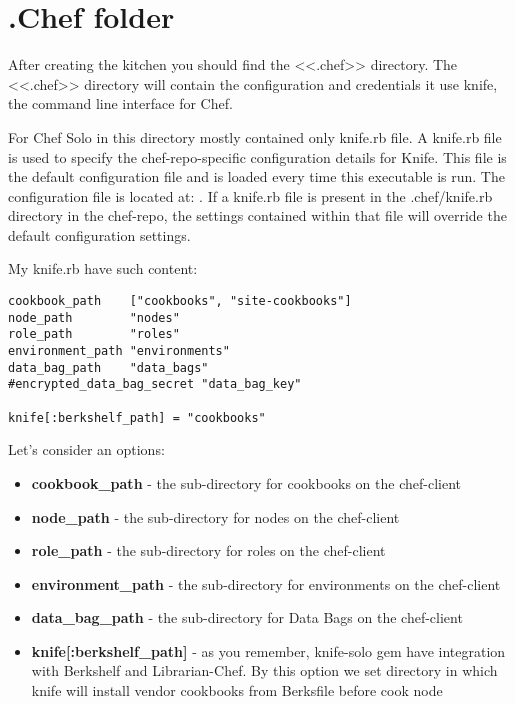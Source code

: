 \section{.Chef folder}\label{sec:solo-chef-folder}

After creating the kitchen you should find the <<.chef>> directory. The <<.chef>> directory will contain the configuration and credentials it use knife, the command line interface for Chef.

For Chef Solo in this directory mostly contained only knife.rb file. A knife.rb file is used to specify the chef-repo-specific configuration details for Knife. This file is the default configuration file and is loaded every time this executable is run. The configuration file is located at: . If a knife.rb file is present in the .chef/knife.rb directory in the chef-repo, the settings contained within that file will override the default configuration settings.

My knife.rb have such content:

\begin{lstlisting}[label=lst:my-cloud-chef-filder1,title=my-cloud/.chef/knife.rb]
cookbook_path    ["cookbooks", "site-cookbooks"]
node_path        "nodes"
role_path        "roles"
environment_path "environments"
data_bag_path    "data_bags"
#encrypted_data_bag_secret "data_bag_key"

knife[:berkshelf_path] = "cookbooks"
\end{lstlisting}

Let's consider an options:

\begin{itemize}
  \item \textbf{cookbook\_path} - the sub-directory for cookbooks on the chef-client
  \item \textbf{node\_path} - the sub-directory for nodes on the chef-client
  \item \textbf{role\_path} - the sub-directory for roles on the chef-client
  \item \textbf{environment\_path} - the sub-directory for environments on the chef-client
  \item \textbf{data\_bag\_path} - the sub-directory for Data Bags on the chef-client
  \item \textbf{knife[:berkshelf\_path]} - as you remember, knife-solo gem have integration with Berkshelf and Librarian-Chef. By this option we set directory in which knife will install vendor cookbooks from Berksfile before cook node
\end{itemize}
